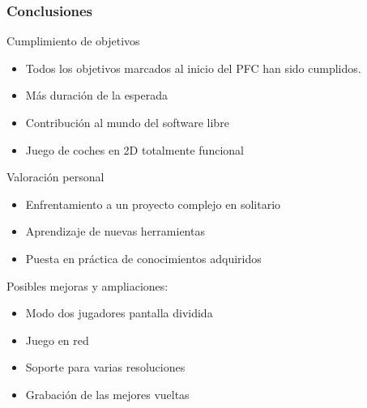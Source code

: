 \begin{frame}
    \frametitle{Conclusiones}

        \begin{block}{Cumplimiento de objetivos}
            \begin{itemize}
                \item Todos los objetivos marcados al inicio del PFC han sido cumplidos.
                \item Más duración de la esperada
                \item Contribución al mundo del software libre
                \item Juego de coches en 2D totalmente funcional
            \end{itemize}
        \end{block}

        \begin{block}{Valoración personal}
            \begin{itemize}
                \item Enfrentamiento a un proyecto complejo en solitario
                \item Aprendizaje de nuevas herramientas
                \item Puesta en práctica de conocimientos adquiridos
            \end{itemize}
        \end{block}


        \begin{block}{Posibles mejoras y ampliaciones:}
            \begin{itemize}
                \item Modo dos jugadores pantalla dividida

                \item Juego en red
                
                \item Soporte para varias resoluciones
                
                \item Grabación de las mejores vueltas
                
            \end{itemize}
        \end{block}
        
\end{frame}

